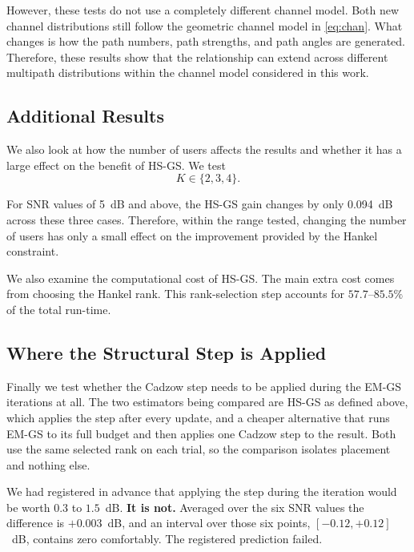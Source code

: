 \documentclass[journal]{IEEEtran}
\begin{document}
However, these tests do not use a completely different channel model. Both new
channel distributions still follow the geometric channel model in
\eqref{eq:chan}. What changes is how the path numbers, path strengths, and path
angles are generated. Therefore, these results show that the relationship can
extend across different multipath distributions within the channel model
considered in this work.

\subsection{Additional Results}

We also look at how the number of users affects the results and whether it has
a large effect on the benefit of HS-GS. We test
\begin{equation}
K\in\{2,3,4\}.
\end{equation}

For SNR values of 5~dB and above, the HS-GS gain changes by only 0.094~dB
across these three cases. Therefore, within the range tested, changing the
number of users has only a small effect on the improvement provided by the
Hankel constraint.

We also examine the computational cost of HS-GS. The main extra cost comes from
choosing the Hankel rank. This rank-selection step accounts for $57.7$--$85.5\%$
of the total run-time.

\subsection{Where the Structural Step is Applied}
\label{sec:placement}

Finally we test whether the Cadzow step needs to be applied during the EM-GS
iterations at all. The two estimators being compared are HS-GS as defined
above, which applies the step after every update, and a cheaper alternative
that runs EM-GS to its full budget and then applies one Cadzow step to the
result. Both use the same selected rank on each trial, so the comparison
isolates placement and nothing else.

We had registered in advance that applying the step during the iteration would
be worth $0.3$ to $1.5$~dB. \textbf{It is not.} Averaged over the six SNR
values the difference is $+0.003$~dB, and an interval over those six points,
$[-0.12,+0.12]$~dB, contains zero comfortably. The registered prediction
failed.
\end{document}

